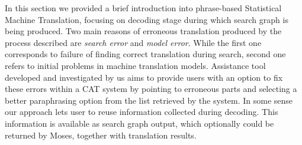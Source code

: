 In this section we provided a brief introduction into phrase-based Statistical Machine Translation, focusing on decoding stage during which search graph is being produced. Two main reasons of erroneous translation produced by the process described are \textit{search error} and \textit{model error}. While the first one corresponds to failure of finding correct translation during search, second one refers to initial problems in machine translation models. Assistance tool developed and investigated by us aims to provide users with an option to fix these errors within a CAT system by pointing to erroneous parts and selecting a better paraphrasing option from the list retrieved by the system. In some sense our approach lets user to reuse information collected during decoding. This information is available as search graph output, which optionally could be returned by Moses, together with translation results. 
